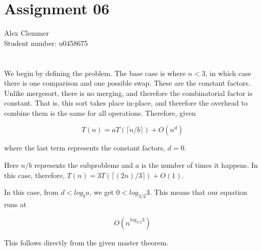 \documentclass[a4paper]{article}
\begin{document}
\section*{Assignment 06}
Alex Clemmer\\
Student number: u0458675

\section*{}

We begin by defining the problem. The base case is where $n < 3$, in which case there is one comparison and one possible swap. These are the constant factors. Unlike mergesort, there is no merging, and therefore the combinatorial factor is constant. That is, this sort takes place in-place, and therefore the overhead to combine them is the same for all operations. Therefore, given 

\begin{equation*}
T(n) = aT(\lceil n/b \rceil) + O(n^d)
\end{equation*}

where the last term represents the constant factors, $d = 0$.

Here $n/b$ represents the subproblems and $a$ is the number of times it happens. In this case, therefore, $T(n) = 3T(\lceil (2n)/3 \rceil) + O(1)$.

In this case, from $d < log_b a$, we get $0 < log_{3/2}3$. This means that our equation runs at

\begin{equation}
O(n^{log_{3/2} 3})
\end{equation}

This follows directly from the given master theorem.
\end{document}
